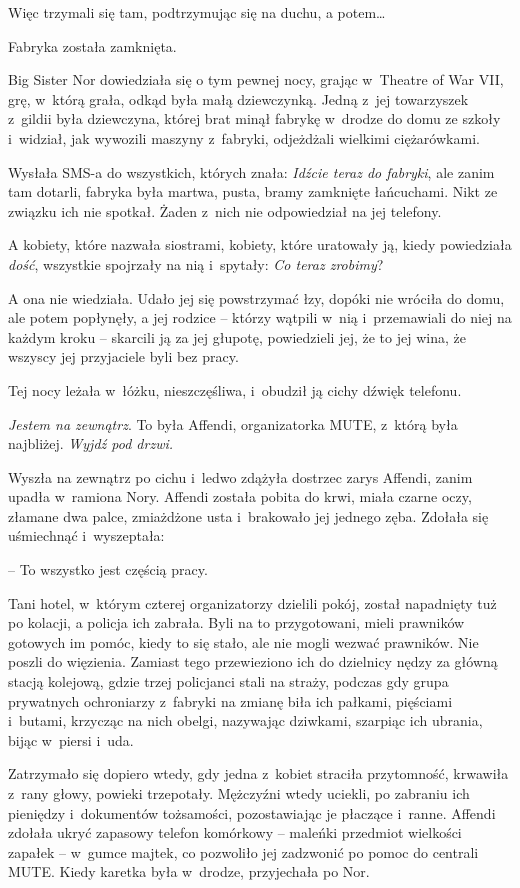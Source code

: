 \documentclass[oneside,polish,11pt,rmheadings]{mwbk}
\begin{document}
Więc trzymali się tam, podtrzymując się na duchu, a potem\ldots  


Fabryka została zamknięta. 


Big Sister Nor dowiedziała się o tym pewnej nocy, grając w~Theatre of War VII, grę, w~którą grała, odkąd była małą dziewczynką. Jedną z~jej towarzyszek z~gildii była dziewczyna, której brat minął fabrykę w~drodze do domu ze szkoły i~widział, jak wywozili maszyny z~fabryki, odjeżdżali wielkimi ciężarówkami. 


Wysłała SMS-a do wszystkich, których znała: \textit{Idźcie teraz do fabryki}, ale zanim tam dotarli, fabryka była martwa, pusta, bramy zamknięte łańcuchami. Nikt ze związku ich nie spotkał. Żaden z~nich nie odpowiedział na jej telefony. 


A kobiety, które nazwała siostrami, kobiety, które uratowały ją, kiedy powiedziała \textit{dość}, wszystkie spojrzały na nią i~spytały: \textit{Co teraz zrobimy}?  


A ona nie wiedziała. Udało jej się powstrzymać łzy, dopóki nie wróciła do domu, ale potem popłynęły, a jej rodzice -- którzy wątpili w~nią i~przemawiali do niej na każdym kroku -- skarcili ją za jej głupotę, powiedzieli jej, że to jej wina, że wszyscy jej przyjaciele byli bez pracy. 


Tej nocy leżała w~łóżku, nieszczęśliwa, i~obudził ją cichy dźwięk telefonu. 


\textit{Jestem na zewnątrz}. To była Affendi, organizatorka MUTE, z~którą była najbliżej. \textit{Wyjdź pod drzwi.} 


Wyszła na zewnątrz po cichu i~ledwo zdążyła dostrzec zarys Affendi, zanim upadła w~ramiona Nory. Affendi została pobita do krwi, miała czarne oczy, złamane dwa palce, zmiażdżone usta i~brakowało jej jednego zęba. Zdołała się uśmiechnąć i~wyszeptała: 

-- To wszystko jest częścią pracy. 


Tani hotel, w~którym czterej organizatorzy dzielili pokój, został napadnięty tuż po kolacji, a policja ich zabrała. Byli na to przygotowani, mieli prawników gotowych im pomóc, kiedy to się stało, ale nie mogli wezwać prawników. Nie poszli do więzienia. Zamiast tego przewieziono ich do dzielnicy nędzy za główną stacją kolejową, gdzie trzej policjanci stali na straży, podczas gdy grupa prywatnych ochroniarzy z~fabryki na zmianę biła ich pałkami, pięściami i~butami, krzycząc na nich obelgi, nazywając dziwkami, szarpiąc ich ubrania, bijąc w~piersi i~uda. 


Zatrzymało się dopiero wtedy, gdy jedna z~kobiet straciła przytomność, krwawiła z~rany głowy, powieki trzepotały. Mężczyźni wtedy uciekli, po zabraniu ich pieniędzy i~dokumentów tożsamości, pozostawiając je płaczące i~ranne. Affendi zdołała ukryć zapasowy telefon komórkowy -- maleńki przedmiot wielkości zapałek -- w~gumce majtek, co pozwoliło jej zadzwonić po pomoc do centrali MUTE. Kiedy karetka była w~drodze, przyjechała po Nor. 
\end{document}
